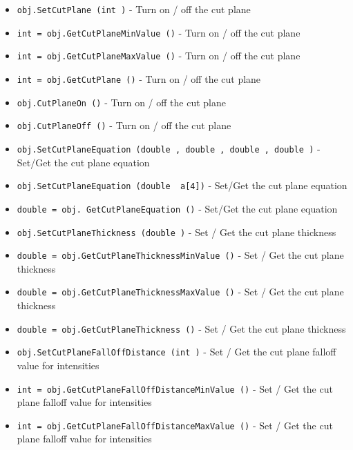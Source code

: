 \begin{itemize}
\item  \verb|obj.SetCutPlane (int )| -  Turn on / off the cut plane

\item  \verb|int = obj.GetCutPlaneMinValue ()| -  Turn on / off the cut plane

\item  \verb|int = obj.GetCutPlaneMaxValue ()| -  Turn on / off the cut plane

\item  \verb|int = obj.GetCutPlane ()| -  Turn on / off the cut plane

\item  \verb|obj.CutPlaneOn ()| -  Turn on / off the cut plane

\item  \verb|obj.CutPlaneOff ()| -  Turn on / off the cut plane

\item  \verb|obj.SetCutPlaneEquation (double , double , double , double )| -  Set/Get the cut plane equation

\item  \verb|obj.SetCutPlaneEquation (double  a[4])| -  Set/Get the cut plane equation

\item  \verb|double = obj. GetCutPlaneEquation ()| -  Set/Get the cut plane equation

\item  \verb|obj.SetCutPlaneThickness (double )| -  Set / Get the cut plane thickness

\item  \verb|double = obj.GetCutPlaneThicknessMinValue ()| -  Set / Get the cut plane thickness

\item  \verb|double = obj.GetCutPlaneThicknessMaxValue ()| -  Set / Get the cut plane thickness

\item  \verb|double = obj.GetCutPlaneThickness ()| -  Set / Get the cut plane thickness

\item  \verb|obj.SetCutPlaneFallOffDistance (int )| -  Set / Get the cut plane falloff value for intensities

\item  \verb|int = obj.GetCutPlaneFallOffDistanceMinValue ()| -  Set / Get the cut plane falloff value for intensities

\item  \verb|int = obj.GetCutPlaneFallOffDistanceMaxValue ()| -  Set / Get the cut plane falloff value for intensities


\end{itemize}
